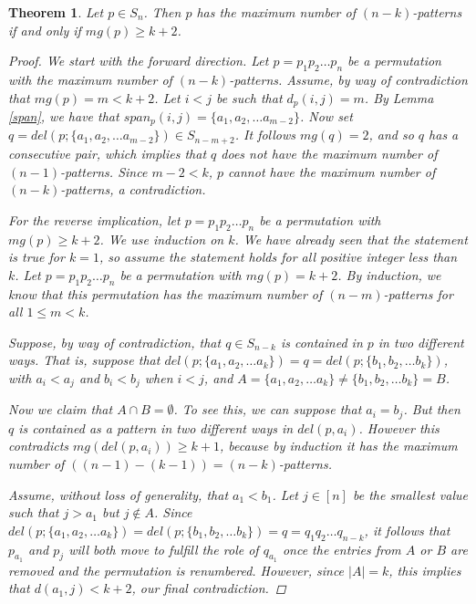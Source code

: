 \documentclass[11pt]{article}
\theoremstyle{plain}
\newtheorem{thm}{Theorem}
\theoremstyle{definition}
\begin{document}
  \begin{thm} \label{otherthm} 
  Let $p \in S_n$. Then $p$ has the maximum number of $(n-k)$-patterns if and
  only if $mg(p) \geq k+2$.  
  \begin{proof}

  We start with the forward direction. Let $p=p_1p_2 \ldots p_n$ be a
  permutation with the maximum number of $(n-k)$-patterns. Assume, by way of
  contradiction that $mg(p) = m < k+2$. Let $i < j$ be such that $d_p(i,j) = m$.
  By Lemma \ref{span}, we have that $span_p(i,j) = \{a_1, a_2, \ldots a_{m-2}
  \}$. Now set $q = del(p;\{ a_1,a_2, \ldots a_{m-2}\})\in S_{n-m+2}$. It
  follows $mg(q)=2$, and so $q$ has a consecutive pair, which implies that $q$
  does not have the maximum number of $(n-1)$-patterns. Since $m-2 < k$, $p$
  cannot have the maximum number of $(n-k)$-patterns, a contradiction.
    
    
    
  For the reverse implication, let $p=p_1p_2 \ldots p_n$ be a permutation with
  $mg(p) \geq k+2$. We use induction on $k$. We have already seen that the
  statement is true for $k=1$, so assume the statement holds for all positive
  integer less than $k$. Let $p=p_1p_2 \ldots p_n$ be a permutation with $mg(p)
  = k+2$. By induction, we know that this permutation has the maximum number of 
  $(n-m)$-patterns for all $1\leq m <k$. 
    
  Suppose, by way of contradiction, that $q \in S_{n-k}$ is contained in $p$ in
  two different ways. That is, suppose that $del(p;\{a_1,a_2, \ldots a_k\}) = q
  = del(p;\{b_1,b_2, \ldots b_k\})$, with $a_i < a_j$ and $b_i<b_j$ when $i<j$,
  and $A = \{a_1, a_2, \ldots a_k \} \not = \{b_1, b_2, \ldots b_k\} = B$. 
    
  Now we claim that $A \cap B = \emptyset$. To see this, we can suppose that
  $a_i = b_j$. But then $q$ is contained as a pattern in two different ways in
  $del(p,a_i)$. However this contradicts $mg(del(p,a_i)) \geq k+1$, because by
  induction it has the maximum number of $((n-1)-(k-1)) = (n-k)$-patterns. 
    
   Assume, without loss of generality, that
  $a_1 < b_1$. Let $j \in [n]$ be the smallest value such that $j>a_1$ but $j
  \notin A$. Since $del(p;\{a_1,a_2, \ldots a_k\}) = del(p;\{b_1,b_2, \ldots
  b_k\}) = q = q_1q_2 \ldots q_{n-k}$, it follows that $p_{a_1}$ and $p_{j}$
  will both move to fulfill the role of $q_{a_1}$ once the entries from $A$ or
  $B$ are removed and the permutation is renumbered. However, since $|A| = k$,
  this implies that $d(a_1, j) < k+2$, our final contradiction. 
    
  \end{proof} \end{thm}
\end{document}
